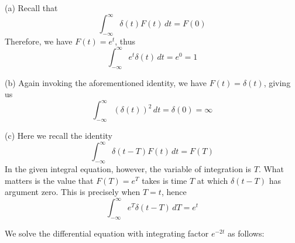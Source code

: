 \documentclass[a4paper]{article}
\begin{document}

(a) Recall that
\[
	\int^{\infty}_{-\infty} \delta \!\left( t \right) F \!\left( t \right)  \, dt = F \!\left( 0 \right)  
\]
Therefore, we have \(F \!\left( t \right) = e^{t}\), thus
\[
	\int^{\infty}_{-\infty} e^{t} \delta \!\left( t \right)  \, dt = e^{0} = 1
\]

(b) Again invoking the aforementioned identity, we have \(F \!\left( t \right) = \delta \!\left( t \right) \), giving us
\[
	\int^{\infty}_{-\infty} \!\left( \delta \!\left( t \right)  \right)^{2} \, dt = \delta \!\left( 0 \right) = \infty 
\]

(c) Here we recall the identity
\[
	\int^{\infty}_{-\infty} \delta \!\left( t - T \right) F \!\left( t \right)  \, dt = F \!\left( T \right)  
\]
In the given integral equation, however, the variable of integration is \(T\). What matters is the value that \(F \!\left( T \right) = e^{T}\) takes is time \(T\) at which \(\delta \!\left( t - T \right) \) has argument zero. This is precisely when \(T = t\), hence
\[
	\int^{\infty}_{-\infty} e^{T} \delta \!\left( t - T \right)  \, dT = e^{t}
\]


We solve the differential equation with integrating factor \(e^{-2t}\) as follows:
\end{document}
